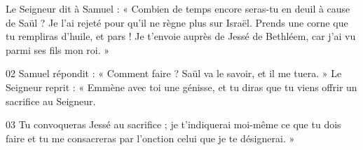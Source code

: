Le Seigneur dit à Samuel : « Combien de temps encore seras-tu en deuil à cause de Saül ? Je l’ai rejeté pour qu’il ne règne plus sur Israël. Prends une corne que tu rempliras d’huile, et pars ! Je t’envoie auprès de Jessé de Bethléem, car j’ai vu parmi ses fils mon roi. »

02 Samuel répondit : « Comment faire ? Saül va le savoir, et il me tuera. » Le Seigneur reprit : « Emmène avec toi une génisse, et tu diras que tu viens offrir un sacrifice au Seigneur.

03 Tu convoqueras Jessé au sacrifice ; je t’indiquerai moi-même ce que tu dois faire et tu me consacreras par l’onction celui que je te désignerai. »

